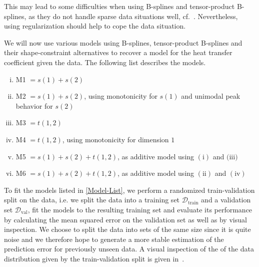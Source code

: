 This may lead to some difficulties when using B-splines and tensor-product B-splines, as they do not handle sparse data situations well, cf.~. Nevertheless, using regularization should help to cope the data situation. 

We will now use various models using B-splines, tensor-product B-splines and their shape-constraint alternatives to recover a model for the heat transfer coefficient given the data. The following list describes the models.

\begin{enumerate}[(i)] \label{Model-List}
	\item M1 $= s(1) + s(2)$
	\item M2 $= s(1) + s(2)$, using monotonicity for $s(1)$ and unimodal peak behavior for $s(2)$
	\item M3 $= t(1,2)$
	\item M4 $= t(1,2)$, using monotonicity for dimension $1$
	\item M5 $= s(1) + s(2) + t(1,2)$, as additive model using $(\text{i})$ and $(\text{iii)}$
	\item M6 $= s(1) +s(2) + t(1,2)$, as additive model using $(\text{ii})$ and $(\text{iv})$
\end{enumerate}

To fit the models listed in \ref{Model-List}, we perform a randomized train-validation split on the data, i.e. we split the data into a training set $\mathcal{D}_{\text{train}}$ and a validation set $\mathcal{D}_{\text{val}}$, fit the models to the resulting training set and evaluate its performance by calculating the mean squared error on the validation set as well as by visual inspection. We choose to split the data into sets of the same size since it is quite noise and we therefore hope to generate a more stable estimation of the prediction error for previously unseen data. A visual inspection of the of the data distribution given by the train-validation split is given in~.

